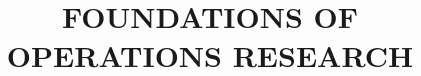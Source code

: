 \documentclass[a4paper, 9pt]{article}
\title{FOUNDATIONS OF OPERATIONS RESEARCH}
\begin{document}
    \maketitle
    \tableofcontents{}
    \newpage
    
\end{document}
